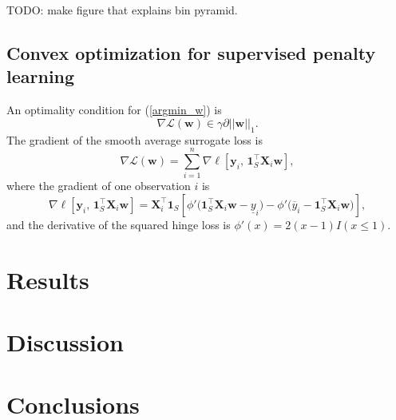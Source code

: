 \documentclass{article} %
\begin{document}
TODO: make figure that explains bin pyramid.

\subsection{Convex optimization for supervised penalty learning}

An optimality condition for (\ref{argmin_w}) is 
\begin{equation}
  \label{eq:optimality}
  \nabla \mathcal L(\mathbf w) \in \gamma \partial ||\mathbf w||_1.
\end{equation}
The gradient of the smooth average surrogate loss is
\begin{equation}
  \label{eq:average_gradient}
  \nabla \mathcal L(\mathbf w) = 
  \sum_{i=1}^n 
  \nabla \ell \left[
    \mathbf y_i,\,
    \mathbf 1_S^\intercal \mathbf X_i \mathbf w
  \right],
\end{equation}
where the gradient of one observation $i$ is
\begin{equation}
  \label{eq:one_gradient}
  \nabla \ell \left[
    \mathbf y_i,\,
    \mathbf 1_S^\intercal \mathbf X_i \mathbf w 
  \right]
  =
  \mathbf X_i^\intercal \mathbf 1_S
  \left[
    \phi'\big(
    \mathbf 1_S^\intercal \mathbf X_i \mathbf w - \underline y_i
    \big)
    -
    \phi'\big(
    \overline y_i - \mathbf 1_S^\intercal \mathbf X_i \mathbf w
    \big)
  \right],
\end{equation}
and the derivative of the squared hinge loss is $\phi'(x)=2(x-1)I(x\leq 1)$.

\section{Results}

\section{Discussion}

\section{Conclusions}



\end{document}
